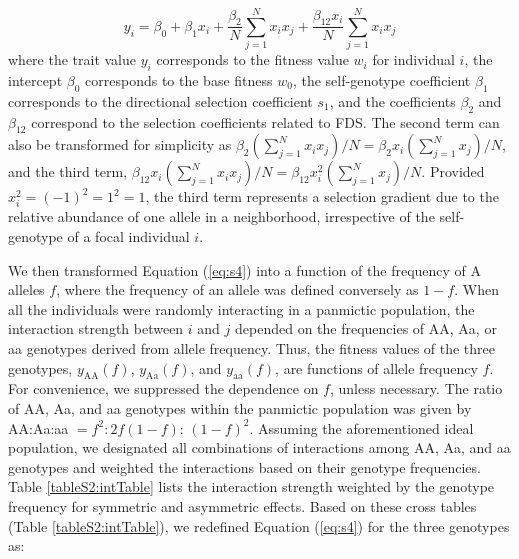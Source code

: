 \documentclass[12pt,]{article}
\begin{document}
\begin{equation}
y_i = \beta_0 + \beta_1x_i + \frac{\beta_2}{N}\sum^{N}_{j=1}{x_ix_j} + \frac{\beta_{12}x_i}{N}\sum^{N}_{j=1}{x_ix_j} \label{eq:s4}
\end{equation}
\noindent
where the trait value $y_i$ corresponds to the fitness value $w_i$ for individual $i$, the intercept $\beta_0$ corresponds to the base fitness $w_0$, the self-genotype coefficient $\beta_1$ corresponds to the directional selection coefficient $s_1$, and the coefficients $\beta_2$ and $\beta_{12}$ correspond to the selection coefficients related to FDS. The second term can also be transformed for simplicity as $\beta_2(\sum^{N}_{j=1}x_i x_j)/N = \beta_2x_i(\sum^{N}_{j=1}x_j)/N$, and the third term, $\beta_{12}x_i(\sum^{N}_{j=1}x_i x_j)/N = \beta_{12}x^2_i(\sum^{N}_{j=1}x_j)/N$. Provided $x^2_i=(-1)^2=1^2=1$, the third term represents a selection gradient due to the relative abundance of one allele in a neighborhood, irrespective of the self-genotype of a focal individual $i$.

We then transformed Equation (\ref{eq:s4}) into a function of the frequency of A alleles $f$, where the frequency of an allele was defined conversely as $1-f$. When all the individuals were randomly interacting in a panmictic population, the interaction strength between $i$ and $j$ depended on the frequencies of AA, Aa, or aa genotypes derived from allele frequency. Thus, the fitness values of the three genotypes, $y_\mathrm{AA}(f)$, $y_\mathrm{Aa}(f)$, and $y_\mathrm{aa}(f)$, are functions of allele frequency $f$. For convenience, we suppressed the dependence on $f$, unless necessary. The ratio of AA, Aa, and aa genotypes within the panmictic population was given by AA:Aa:aa $=f^2: 2f(1-f)$: $(1-f)^2$. Assuming the aforementioned ideal population, we designated all combinations of interactions among AA, Aa, and aa genotypes and weighted the interactions based on their genotype frequencies. Table \ref{tableS2:intTable} lists the interaction strength weighted by the genotype frequency for symmetric and asymmetric effects. Based on these cross tables (Table \ref{tableS2:intTable}), we redefined Equation (\ref{eq:s4}) for the three genotypes as: 
\end{document}
